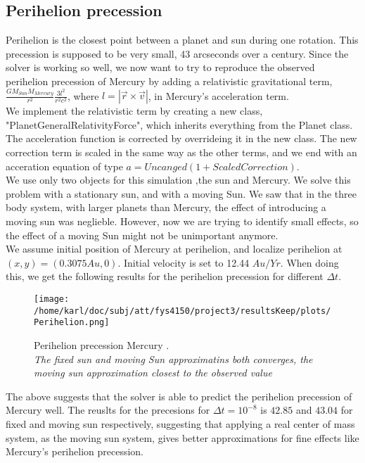 \documentclass{article}
\begin{document}
\subsection{Perihelion precession}
Perihelion is the closest point between a planet and sun during one rotation. This precession is supposed to be very small, 43 arcseconds over a century. Since the solver is working so well, we now want to try to reproduce the observed perihelion precession of Mercury by adding a relativistic gravitational term,$\frac{GM_{Sun} M_{Mercury}}{r^2} \frac{3l^2}{r^2c^2}$, where $l = |\vec{r} \times \vec{v}|$, in Mercury's acceleration term.  \\

We implement the relativistic term by creating a new class, "PlanetGeneralRelativityForce", which inherits everything from the Planet class. The acceleration function is corrected by overrideing it in the new class. The new correction term is scaled in the same way as the other terms, and we  end with an acceration equation of type $a = Uncanged(1 + ScaledCorrection)$. \\

We use only two objects for this simulation ,the sun and Mercury. We solve this problem with a stationary sun, and with a moving Sun. We saw that in the three body system, with larger planets than Mercury, the effect of introducing a moving sun was neglieble. However, now we are trying to identify small effects, so the effect of a moving Sun might not be unimportant anymore. \\

We assume initial position of Mercury at perihelion, and localize perihelion at $(x,y) = (0.3075 Au, 0)$. Initial velocity is set to 12.44 $Au/Yr$. When doing this, we get the following results for the perihelion precession for different $\Delta t$.\\

\begin{figure}[H]
	\centering
	\texttt{[image: /home/karl/doc/subj/att/fys4150/project3/resultsKeep/plots/Perihelion.png]}
	\caption{Perihelion precession Mercury . \\ \textit{The fixed sun and moving Sun approximatins both converges, the moving sun approximation closest to the observed value}}
	\label{1}
\end{figure}

The above suggests that the solver is able to predict the perihelion precession of Mercury well. The reuslts for the precesions for $\Delta t = 10^{-8}$ is $42.85$ and $43.04$ for fixed and moving sun respectively, suggesting that applying a real center of mass system, as the moving sun system, gives better approximations for fine effects like Mercury's perihelion precession.
\end{document}
